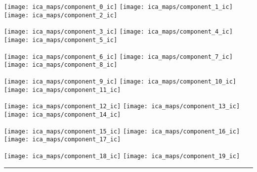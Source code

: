 \documentclass{article}
\begin{document}
\pagestyle{empty}

\begin{preview}
    \texttt{[image: ica\_maps/component\_0\_ic]}%
    \hfill%
    \texttt{[image: ica\_maps/component\_1\_ic]}%
    \hfill%
    \texttt{[image: ica\_maps/component\_2\_ic]}%

    \texttt{[image: ica\_maps/component\_3\_ic]}%
    \hfill%
    \texttt{[image: ica\_maps/component\_4\_ic]}%
    \hfill%
    \texttt{[image: ica\_maps/component\_5\_ic]}%

    \texttt{[image: ica\_maps/component\_6\_ic]}%
    \hfill%
    \texttt{[image: ica\_maps/component\_7\_ic]}%
    \hfill%
    \texttt{[image: ica\_maps/component\_8\_ic]}%

    \texttt{[image: ica\_maps/component\_9\_ic]}%
    \hfill%
    \texttt{[image: ica\_maps/component\_10\_ic]}%
    \hfill%
    \texttt{[image: ica\_maps/component\_11\_ic]}%

    \texttt{[image: ica\_maps/component\_12\_ic]}%
    \hfill%
    \texttt{[image: ica\_maps/component\_13\_ic]}%
    \hfill%
    \texttt{[image: ica\_maps/component\_14\_ic]}%

    \texttt{[image: ica\_maps/component\_15\_ic]}%
    \hfill%
    \texttt{[image: ica\_maps/component\_16\_ic]}%
    \hfill%
    \texttt{[image: ica\_maps/component\_17\_ic]}%

    \texttt{[image: ica\_maps/component\_18\_ic]}%
    \hfill%
    \texttt{[image: ica\_maps/component\_19\_ic]}%
    \hfill%
    \rule{.315\linewidth}{0pt}

\end{preview}
\end{document}
